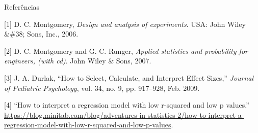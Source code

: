 \documentclass[
  ignorenonframetext,
]{beamer}
\begin{document}
\begin{frame}{Referências}
\protect\hypertarget{referencias}{}

\hypertarget{refs}{}
\leavevmode\hypertarget{ref-Montgomery:2006:applied}{}%
{[}1{]} D. C. Montgomery, \emph{Design and analysis of experiments}.
USA: John Wiley \&\#38; Sons, Inc., 2006.

\leavevmode\hypertarget{ref-montgomery2007applied}{}%
{[}2{]} D. C. Montgomery and G. C. Runger, \emph{Applied statistics and
probability for engineers, (with cd)}. John Wiley \& Sons, 2007.

\leavevmode\hypertarget{ref-10.1093ux2fjpepsyux2fjsp004}{}%
{[}3{]} J. A. Durlak, ``How to Select, Calculate, and Interpret Effect
Sizes,'' \emph{Journal of Pediatric Psychology}, vol. 34, no. 9, pp.
917--928, Feb. 2009.

\leavevmode\hypertarget{ref-HowtoInt53:online}{}%
{[}4{]} ``How to interpret a regression model with low r-squared and low
p values.''
\url{https://blog.minitab.com/blog/adventures-in-statistics-2/how-to-interpret-a-regression-model-with-low-r-squared-and-low-p-values}.

\end{frame}
\end{document}
